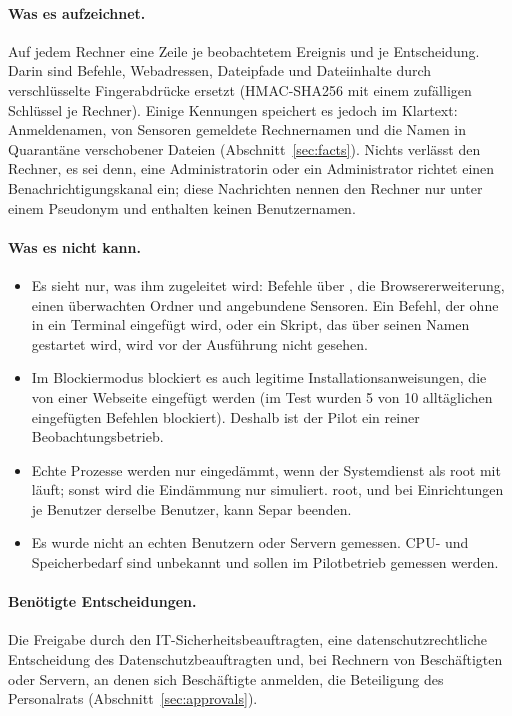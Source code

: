 \documentclass[11pt,a4paper]{article}
\begin{document}
\paragraph{Was es aufzeichnet.} Auf jedem Rechner eine Zeile je beobachtetem Ereignis und je
Entscheidung. Darin sind Befehle, Webadressen, Dateipfade und Dateiinhalte durch verschlüsselte
Fingerabdrücke ersetzt (HMAC-SHA256 mit einem zufälligen Schlüssel je Rechner). Einige Kennungen
speichert es jedoch im Klartext: Anmeldenamen, von Sensoren gemeldete Rechnernamen und die Namen
in Quarantäne verschobener Dateien (Abschnitt~\ref{sec:facts}). Nichts verlässt den Rechner, es
sei denn, eine Administratorin oder ein Administrator richtet einen Benachrichtigungskanal ein;
diese Nachrichten nennen den Rechner nur unter einem Pseudonym und enthalten keinen Benutzernamen.

\paragraph{Was es nicht kann.}
\begin{itemize}
  \item Es sieht nur, was ihm zugeleitet wird: Befehle über , die
        Browsererweiterung, einen überwachten Ordner und angebundene Sensoren. Ein Befehl, der ohne
         in ein Terminal eingefügt wird, oder ein Skript, das über seinen Namen
        gestartet wird, wird vor der Ausführung nicht gesehen.
  \item Im Blockiermodus blockiert es auch legitime Installationsanweisungen, die von einer
        Webseite eingefügt werden (im Test wurden 5 von 10 alltäglichen eingefügten Befehlen
        blockiert). Deshalb ist der Pilot ein reiner Beobachtungsbetrieb.
  \item Echte Prozesse werden nur eingedämmt, wenn der Systemdienst als root mit 
        läuft; sonst wird die Eindämmung nur simuliert. root, und bei Einrichtungen je Benutzer
        derselbe Benutzer, kann Separ beenden.
  \item Es wurde nicht an echten Benutzern oder Servern gemessen. CPU- und Speicherbedarf sind
        unbekannt und sollen im Pilotbetrieb gemessen werden.
\end{itemize}

\paragraph{Benötigte Entscheidungen.} Die Freigabe durch den IT-Sicherheitsbeauftragten, eine
datenschutzrechtliche Entscheidung des Datenschutzbeauftragten und, bei Rechnern von
Beschäftigten oder Servern, an denen sich Beschäftigte anmelden, die Beteiligung des
Personalrats (Abschnitt~\ref{sec:approvals}).
\end{document}
